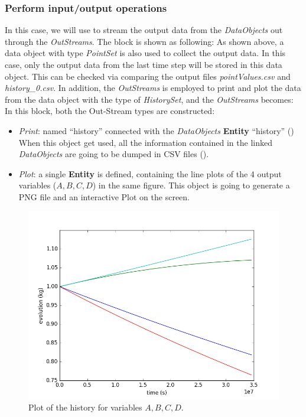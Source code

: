\subsubsection{Perform input/output operations}
In this case, we will use  to stream the output data from the \textit{DataObjects} out through the
\textit{OutStreams}. The  block is shown as following:
As shown above, a data object with type \textit{PointSet} is also used to collect the output data. In this case, only
the output data from the last time step will be stored in this data object. This can be checked via comparing the
output files \textit{pointValues.csv} and \textit{history\_0.csv}. In addition,
the \textit{OutStreams} is employed to print and plot the data from the data object with the type of \textit{HistorySet}, and
the \textit{OutStreams} becomes:
In this block, both the Out-Stream types are constructed:
\begin{itemize}
  \item \textit{Print}: named ``history'' connected with the \textit{DataObjects} \textbf{Entity} ``history'' ()
  When this object get used, all the information contained in the linked  \textit{DataObjects} are going
  to be dumped in CSV files ().
  \item \textit{Plot}: a single  \textbf{Entity} is defined, containing the line plots of the 4 output variables
  ($A,B,C,D$) in the same figure. This object is going to generate a PNG file and an interactive Plot on
  the screen.
\end{itemize}

\begin{figure}[h!]
  \centering
  \includegraphics[scale=0.7]{../../tests/framework/user_guide/SingleRuns/gold/singleRunPlot/1-historyPlot_line-line-line-line.png}
  \caption{Plot of the history for variables $A,B,C,D$.}
  \label{fig:historyPlotLine}
\end{figure}

